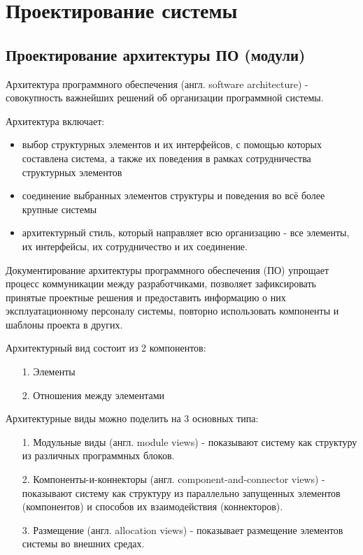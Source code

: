 \newpage

\section{Проектирование системы}

\subsection{Проектирование архитектуры ПО (модули)}

Архитектура программного обеспечения (англ. software architecture) - совокупность
важнейших решений об организации программной системы.

Архитектура включает:

\begin{itemize}
    \item выбор структурных элементов и их интерфейсов, с помощью которых составлена система,
    а также их поведения в рамках сотрудничества структурных элементов
    \item соединение выбранных элементов структуры и поведения во всё более крупные системы
    \item архитектурный стиль, который направляет всю организацию - все элементы, их интерфейсы,
    их сотрудничество и их соединение.
\end{itemize}

Документирование архитектуры программного обеспечения (ПО) упрощает процесс коммуникации
между разработчиками, позволяет зафиксировать принятые проектные решения
и предоставить информацию о них эксплуатационному персоналу системы,
повторно использовать компоненты и шаблоны проекта в других.

Архитектурный вид состоит из 2 компонентов:

\begin{enumerate}
    \item [1.] Элементы
    \item [2.] Отношения между элементами
\end{enumerate}

Архитектурные виды можно поделить на 3 основных типа:

\begin{itemize}
    \item [1.] Модульные виды (англ. module views) - показывают систему как структуру
    из различных программных блоков.
    \item [2.] Компоненты-и-коннекторы (англ. component-and-connector views) - показывают
    систему как структуру из параллельно запущенных элементов (компонентов)
    и способов их взаимодействия (коннекторов).
    \item [3.] Размещение (англ. allocation views) - показывает размещение
    элементов системы во внешних средах.
\end{itemize}

